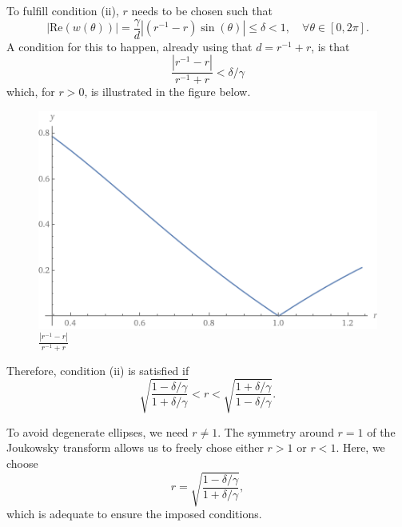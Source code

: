 \documentclass[10pt,a4paper,final]{article}
\begin{document}
To fulfill condition (ii), $r$ needs to be chosen such that 
\begin{equation}
|\text{Re}(w(\theta))|=\frac{\gamma}{d}|(r^{-1}-r)\sin(\theta)|\leq\delta <1 , \quad \forall \theta \in [0, 2\pi].
\end{equation}
A condition for this to happen, already using that $d=r^{-1}+r$, is that
\begin{equation}
\frac{|r^{-1}-r|}{r^{-1}+r}<\delta /\gamma
\end{equation}
which, for $r>0$, is illustrated in the figure below.

\begin{figure}[h!]
\centering
\includegraphics[scale=0.7]{rlimits1}
\caption{$\frac{|r^{-1}-r|}{r^{-1}+r}$}
\end{figure}

Therefore, condition (ii) is satisfied if 
\begin{equation}
\sqrt{\frac{1-\delta/\gamma}{1+\delta/\gamma}} <r<\sqrt{\frac{1+\delta/\gamma}{1-\delta/\gamma}}. 
\end{equation}

To avoid degenerate ellipses, we need $r\neq 1$. The symmetry around $r=1$ of the Joukowsky transform allows us to freely chose either $r>1$ or $r<1$. Here, we choose
\begin{equation}
r=\sqrt{\frac{1-\delta/\gamma}{1+\delta/\gamma}},
\end{equation}
which is adequate to ensure the imposed conditions.
\end{document}

